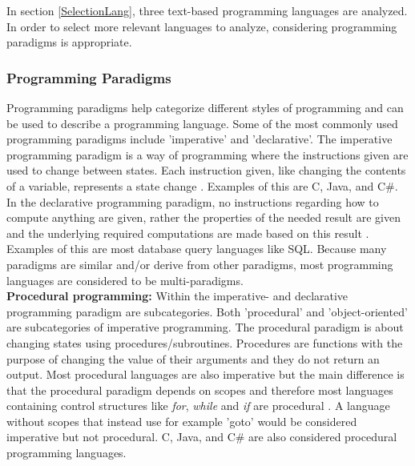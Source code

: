
In section \ref{SelectionLang}, three text-based programming languages are analyzed. In order to select more relevant languages to analyze, considering programming paradigms is appropriate.

\subsubsection{Programming Paradigms}
Programming paradigms help categorize different styles of programming and can be used to describe a programming language. Some of the most commonly used programming paradigms include 'imperative' and 'declarative'. The imperative programming paradigm is a way of programming where the instructions given are used to change between states. Each instruction given, like changing the contents of a variable, represents a state change \cite{WikiProgrammingParadigms}. Examples of this are C, Java, and C\#. \\
In the declarative programming paradigm, no instructions regarding how to compute anything are given, rather the properties of the needed result are given and the underlying required computations are made based on this result \cite{WikiProgrammingParadigms}. Examples of this are most database query languages like SQL. Because many paradigms are similar and/or derive from other paradigms, most programming languages are considered to be multi-paradigms.\\ 

\newpage \noindent
\textbf{Procedural programming:} Within the imperative- and declarative programming paradigm are subcategories. Both 'procedural' and 'object-oriented' are subcategories of imperative programming. The procedural paradigm is about changing states using procedures/subroutines. Procedures are functions with the purpose of changing the value of their arguments and they do not return an output. Most procedural languages are also imperative but the main difference is that the procedural paradigm depends on scopes and therefore most languages containing control structures like \textit{for}, \textit{while} and \textit{if} are procedural \cite{WikiProgrammingParadigms}. A language without scopes that instead use for example 'goto' would be considered imperative but not procedural. C, Java, and C\# are also considered procedural programming languages. \\

